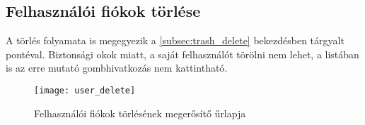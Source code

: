 \subsection{Felhasználói fiókok törlése}

A törlés folyamata is megegyezik a \ref{subsec:trash_delete} bekezdésben tárgyalt pontéval. Biztonsági okok miatt, a saját felhasználót törölni nem lehet, a listában is az erre mutató gombhivatkozás nem kattintható.

\begin{figure}[H]
	\centering
	\texttt{[image: user\_delete]}
	\caption{Felhasználói fiókok törlésének megerősítő űrlapja}
	\label{fig:user_delete}
\end{figure}